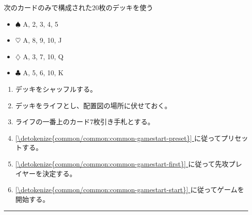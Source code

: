 \documentclass[letterpaper,10pt,dvipdfmx]{sphinxmanual}
\begin{document}
\sphinxAtStartPar
{}

\sphinxAtStartPar
次のカードのみで構成された20枚のデッキを使う
\begin{itemize}
\item {} 
\sphinxAtStartPar
{\normalsize $\spadesuit$} A, 2, 3, 4, 5

\item {} 
\sphinxAtStartPar
{\normalsize $\heartsuit$} A, 8, 9, 10, J

\item {} 
\sphinxAtStartPar
{\normalsize $\diamondsuit$} A, 3, 7, 10, Q

\item {} 
\sphinxAtStartPar
{\normalsize $\clubsuit$} A, 5, 6, 10, K

\end{itemize}

\sphinxAtStartPar
{}
\begin{enumerate}
%
\item {} 
\sphinxAtStartPar
デッキをシャッフルする。

\item {} 
\sphinxAtStartPar
デッキをライフとし、配置図の場所に伏せておく。

\item {} 
\sphinxAtStartPar
ライフの一番上のカード7枚引き手札とする。

\item {} 
\sphinxAtStartPar
\hyperref[\detokenize{common/common:common-gamestart-preset}]{\ref{\detokenize{common/common:common-gamestart-preset}} } に従ってプリセットする。

\item {} 
\sphinxAtStartPar
\hyperref[\detokenize{common/common:common-gamestart-first}]{\ref{\detokenize{common/common:common-gamestart-first}} } に従って先攻プレイヤーを決定する。

\item {} 
\sphinxAtStartPar
\hyperref[\detokenize{common/common:common-gamestart-start}]{\ref{\detokenize{common/common:common-gamestart-start}} } に従ってゲームを開始する。

\end{enumerate}


\bigskip\hrule\bigskip
\end{document}
